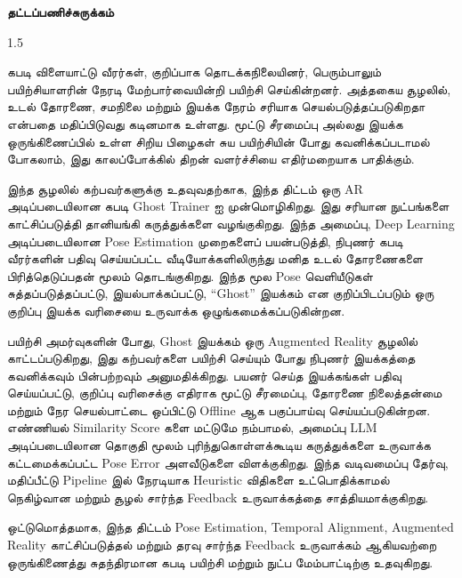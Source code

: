 \clearpage
{}
{}

\begin{center}
    {\tamilfont\Large\bfseries தட்டப்பணிச்சுருக்கம்}
\end{center}

\vspace{1em}

\begin{spacing}{1.5}
\begin{sloppypar}

{\tamilfont
கபடி விளையாட்டு வீரர்கள், குறிப்பாக தொடக்கநிலையினர், பெரும்பாலும்
பயிற்சியாளரின் நேரடி மேற்பார்வையின்றி பயிற்சி செய்கின்றனர். அத்தகைய
சூழலில், உடல் தோரணை, சமநிலை மற்றும் இயக்க நேரம் சரியாக
செயல்படுத்தப்படுகிறதா என்பதை மதிப்பிடுவது கடினமாக உள்ளது. மூட்டு
சீரமைப்பு அல்லது இயக்க ஒருங்கிணைப்பில் உள்ள சிறிய பிழைகள் சுய
பயிற்சியின் போது கவனிக்கப்படாமல் போகலாம், இது காலப்போக்கில் திறன்
வளர்ச்சியை எதிர்மறையாக பாதிக்கும்.

இந்த சூழலில் கற்பவர்களுக்கு உதவுவதற்காக, இந்த திட்டம் ஒரு
\textnormal{AR} அடிப்படையிலான கபடி \textnormal{Ghost Trainer} ஐ முன்மொழிகிறது.
இது சரியான நுட்பங்களை காட்சிப்படுத்தி தானியங்கி கருத்துக்களை வழங்குகிறது.
இந்த அமைப்பு, \textnormal{Deep Learning} அடிப்படையிலான \textnormal{Pose Estimation}
முறைகளைப் பயன்படுத்தி, நிபுணர் கபடி வீரர்களின் பதிவு செய்யப்பட்ட
வீடியோக்களிலிருந்து மனித உடல் தோரணைகளை பிரித்தெடுப்பதன் மூலம்
தொடங்குகிறது. இந்த மூல \textnormal{Pose} வெளியீடுகள் சுத்தப்படுத்தப்பட்டு,
இயல்பாக்கப்பட்டு, ``\textnormal{Ghost}'' இயக்கம் என குறிப்பிடப்படும் ஒரு
குறிப்பு இயக்க வரிசையை உருவாக்க ஒழுங்கமைக்கப்படுகின்றன.

பயிற்சி அமர்வுகளின் போது, \textnormal{Ghost} இயக்கம் ஒரு
\textnormal{Augmented Reality} சூழலில் காட்டப்படுகிறது, இது கற்பவர்களை
பயிற்சி செய்யும் போது நிபுணர் இயக்கத்தை கவனிக்கவும் பின்பற்றவும்
அனுமதிக்கிறது. பயனர் செய்த இயக்கங்கள் பதிவு செய்யப்பட்டு, குறிப்பு
வரிசைக்கு எதிராக மூட்டு சீரமைப்பு, தோரணை நிலைத்தன்மை மற்றும் நேர
செயல்பாட்டை ஒப்பிட்டு \textnormal{Offline} ஆக பகுப்பாய்வு செய்யப்படுகின்றன.
எண்ணியல் \textnormal{Similarity Score} களை மட்டுமே நம்பாமல், அமைப்பு
\textnormal{LLM} அடிப்படையிலான தொகுதி மூலம் புரிந்துகொள்ளக்கூடிய
கருத்துக்களை உருவாக்க கட்டமைக்கப்பட்ட \textnormal{Pose Error} அளவீடுகளை
விளக்குகிறது. இந்த வடிவமைப்பு தேர்வு, மதிப்பீட்டு \textnormal{Pipeline} இல்
நேரடியாக \textnormal{Heuristic} விதிகளை உட்பொதிக்காமல் நெகிழ்வான மற்றும்
சூழல் சார்ந்த \textnormal{Feedback} உருவாக்கத்தை சாத்தியமாக்குகிறது.

ஒட்டுமொத்தமாக, இந்த திட்டம் \textnormal{Pose Estimation, Temporal Alignment,
Augmented Reality} காட்சிப்படுத்தல் மற்றும் தரவு சார்ந்த \textnormal{Feedback}
உருவாக்கம் ஆகியவற்றை ஒருங்கிணைத்து சுதந்திரமான கபடி பயிற்சி
மற்றும் நுட்ப மேம்பாட்டிற்கு உதவுகிறது.
}

\end{sloppypar}
\end{spacing}
